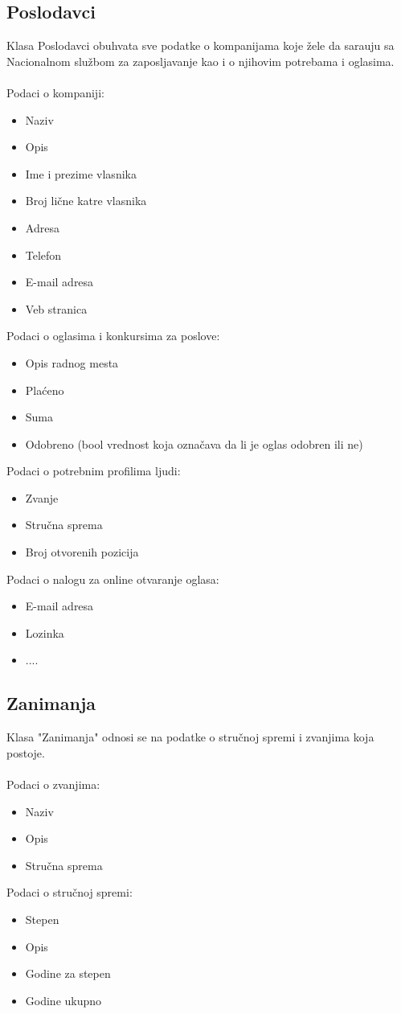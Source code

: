 \subsection{Poslodavci}
Klasa Poslodavci obuhvata sve podatke o kompanijama koje \v zele da sara\dj uju sa Nacionalnom slu\v zbom za zaposljavanje kao i o njihovim potrebama i oglasima.
\\
\\ Podaci o kompaniji:
\begin{itemize}
	\item Naziv
	\item Opis
	\item Ime i prezime vlasnika
	\item Broj li\v cne katre vlasnika
	\item Adresa
	\item Telefon
	\item E-mail adresa
	\item Veb stranica
\end{itemize}

\noindent Podaci o oglasima i konkursima za poslove:
\begin{itemize}
	\item Opis radnog mesta
	\item Pla\' ceno
	\item Suma
	\item Odobreno (bool vrednost koja ozna\v cava da li je oglas odobren ili ne)
\end{itemize}

\noindent Podaci o potrebnim profilima ljudi:
\begin{itemize}
	\item Zvanje
	\item Stru\v cna sprema
	\item Broj otvorenih pozicija
\end{itemize}

\noindent Podaci o nalogu za online otvaranje oglasa:
\begin{itemize}
	\item E-mail adresa
	\item Lozinka
	\item ....
\end{itemize}


\subsection{Zanimanja}
Klasa "Zanimanja" odnosi se na podatke o stru\v cnoj spremi i zvanjima koja postoje.
\\
\\ Podaci o zvanjima:
\begin{itemize}
	\item Naziv
	\item Opis
	\item Stru\v cna sprema
\end{itemize}

\noindent Podaci o stru\v cnoj spremi:
\begin{itemize}
	\item Stepen
	\item Opis
	\item Godine za stepen
	\item Godine ukupno
\end{itemize}
